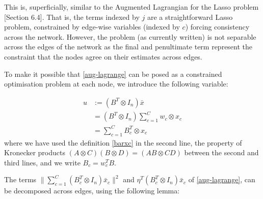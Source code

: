 This is, superficially, similar to the Augmented Lagrangian for the Lasso problem \cite{Boyd2010a}[Section 6.4]. That is, the terms indexed by \(j\) are a straightforward Lasso problem, constrained by edge-wise variables (indexed by \(c\)) forcing consistency across the network. However, the problem (as currently written) is not separable across the edges of the network as the final and penultimate term represent the constraint that the nodes agree on their estimates across edges. 

To make it possible that \ref{aug-lagrange} can be posed  as a constrained optimisation problem at each node, we introduce the following variable:

\begin{defn}
\begin{align*}
u &:= \left(B^T \otimes I_n\right)\bar{x} \\
& = \left(B^T \otimes I_n\right)\sum_{c=1}^C w_c \otimes x_c \\
& = \sum	_{c=1}^C B_c^T\otimes x_c
\end{align*}
where we have used the definition \eqref{barxc} in the second line, the property of Kronecker products \((A\otimes C)(B \otimes D) = (AB \otimes CD)\) between the second and third lines, and we write \(B_c = w_c^TB\).
\end{defn}

The terms \(\|\sum_{c=1}^C\left(B_c^T \otimes I_n\right)\bar{x}_c\|^2\) and \( \eta^T\left(B_c^T \otimes I_n\right)\bar{x}_c \) of \eqref{aug-lagrange}, can be decomposed across edges, using the following lemma:

